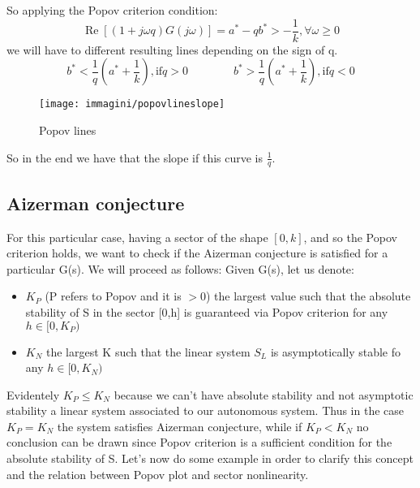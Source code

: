 So applying the Popov criterion condition: \[\operatorname{Re}[(1+j\omega q)G(j\omega)]=a^*-qb^*>-\frac{1}{k},\forall\omega \ge0\] we will have to different resulting lines depending on the sign of q.
\[
b^*<\frac{1}{q}(a^*+\frac{1}{k}), \text{if} q >0 \qquad \qquad b^*>\frac{1}{q}(a^*+\frac{1}{k}), \text{if} q <0 
\]
\begin{figure}[H]
	\centering
	\texttt{[image: immagini/popovlineslope]}
	\caption{Popov lines}
	\label{fig:popovlineslope}
\end{figure}
So in the end we have that the slope if this curve is $\frac{1}{q}$.
\subsection{Aizerman conjecture}
For this particular case, having a sector of the shape $[0,k]$, and so the Popov criterion holds, we want to check if the Aizerman conjecture is satisfied for a particular G(s). We will proceed as follows:
Given G(s), let us denote:
\begin{itemize}
	\item $K_P$ (P refers to Popov and it is $>0$) the largest value such that the absolute stability of S in the sector [0,h] is guaranteed via Popov criterion for any $h\in[0,K_P)$
	\item $K_N$ the largest K such that the linear system $S_L$ is asymptotically stable fo any $h\in[0,K_N)$
\end{itemize}
Evidentely $K_P\le K_N$ because we can't have absolute stability and not asymptotic stability a linear system associated to our autonomous system. Thus in the case $K_P=K_N$ the system satisfies Aizerman conjecture, while if $K_P<K_N$ no conclusion can be drawn since Popov criterion is a sufficient condition for the absolute stability of S.
\linebreak
Let's now do some example in order to clarify this concept and the relation between Popov plot and sector nonlinearity.

